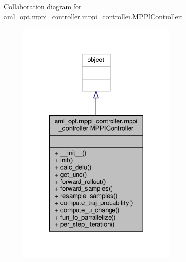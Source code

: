 Collaboration diagram for aml\-\_\-opt.\-mppi\-\_\-controller.\-mppi\-\_\-controller.\-M\-P\-P\-I\-Controller\-:\nopagebreak
\begin{figure}[H]
\begin{center}
\leavevmode
\includegraphics[width=224pt]{classaml__opt_1_1mppi__controller_1_1mppi__controller_1_1_m_p_p_i_controller__coll__graph}
\end{center}
\end{figure}
